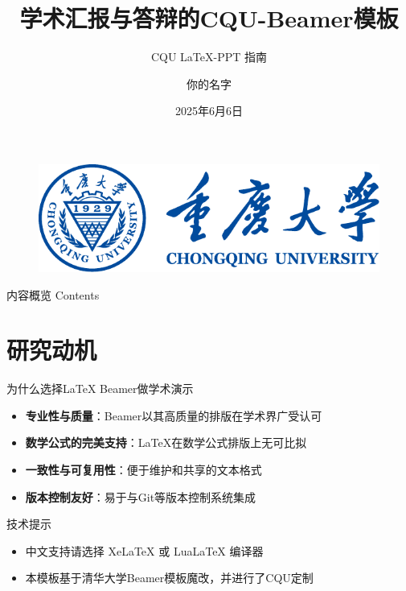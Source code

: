 \documentclass{beamer}  %
\author{你的名字}
\title{学术汇报与答辩的CQU-Beamer模板}
\subtitle{CQU LaTeX-PPT 指南}
\institute{重庆大学计算机学院}
\date{2025年6月6日}
\begin{document}
\kaishu  %
\begin{frame}
    \titlepage  %
    \begin{figure}[htpb]
        \begin{center}
            \includegraphics[width=0.5\linewidth]{pic/校徽+中英文校名_蓝色.pdf}
        \end{center}
    \end{figure}
\end{frame}

\begin{frame}{内容概览 Contents}
    \tableofcontents[sectionstyle=show]
\end{frame}


\section{研究动机}

\begin{frame}{为什么选择LaTeX Beamer做学术演示}
    \begin{itemize} 
        \item \textbf{专业性与质量}：Beamer以其高质量的排版在学术界广受认可
        \pause
        \item \textbf{数学公式的完美支持}：\LaTeX{}在数学公式排版上无可比拟
        \pause
        \item \textbf{一致性与可复用性}：便于维护和共享的文本格式
        \pause
        \item \textbf{版本控制友好}：易于与Git等版本控制系统集成
    \end{itemize}
    \vspace{0.5cm}
    \begin{block}{技术提示}
        \begin{itemize}
            \item 中文支持请选择 Xe\LaTeX{} 或 Lua\LaTeX{} 编译器
            \item 本模板基于清华大学Beamer模板魔改，并进行了CQU定制
        \end{itemize}
    \end{block}
\end{frame}
\end{document}
